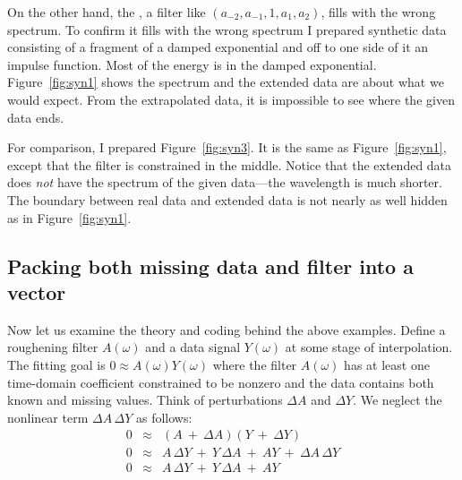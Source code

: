 \par
On the other hand,
the ,
a filter like $(a_{-2}, a_{-1}, 1, a_1, a_2)$,
fills with the wrong spectrum.
To confirm it fills with the wrong spectrum
I prepared synthetic data consisting of a fragment of a damped exponential
and off to one side of it an impulse function.
Most of the energy is in the damped exponential.
Figure~\ref{fig:syn1} shows the spectrum and the extended data
are about what we would expect.
From the extrapolated data,
it is impossible to see where the given data ends.


For comparison, I prepared
Figure~\ref{fig:syn3}.
It is the same as
Figure~\ref{fig:syn1},
except that the filter is constrained in the middle.
Notice that the extended data does {\it not} have the spectrum
of the given data---the wavelength is much shorter.
The boundary between real data and extended data
is not nearly as well hidden as in
Figure~\ref{fig:syn1}.


\subsection{Packing both missing data and filter into a vector}
Now let us examine the theory and coding behind the above examples.
Define a roughening filter $A(\omega )$ and a data signal $Y(\omega )$
at some stage of interpolation.
The fitting goal is
$0 \approx A(\omega ) Y(\omega )$
where the filter $A(\omega )$ has
at least one time-domain coefficient constrained to be nonzero
and the data contains both known and missing values.
Think of perturbations $\Delta A$ and $\Delta Y$.
We neglect the nonlinear term $\Delta A\,\Delta Y$ as follows:
\begin{eqnarray}
0 &\approx & (A \ +\ \Delta A)( Y\ +\ \Delta Y) \\
0 &\approx &
        A\,\Delta Y   \ +\ 
        Y\,\Delta A   \ +\ 
        AY
        \ +\ 
        \Delta A\, \Delta Y                             \\
        0
        &\approx & 
        A\,\Delta Y   \ +\ 
        Y\,\Delta A   \ +\ 
        AY
\label{eqn:nlreg}
\end{eqnarray}


